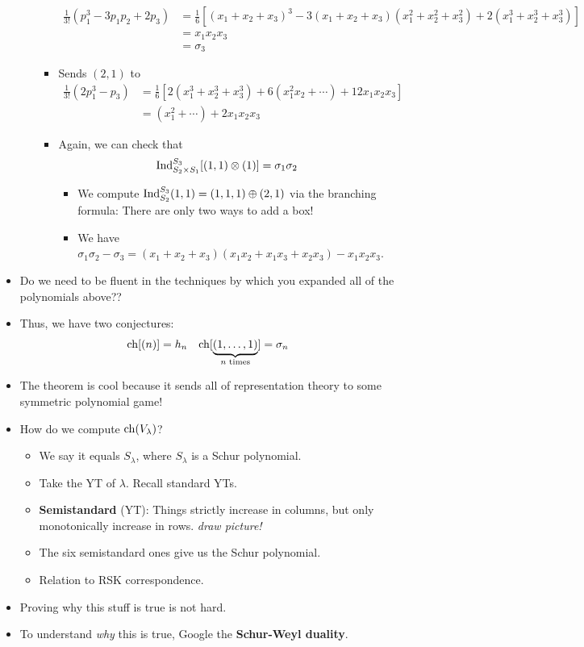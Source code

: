 \documentclass[../notes.tex]{subfiles}
\begin{document}
\begin{itemize}
\begin{enumerate}
\begin{itemize}
\begin{align*}
                \frac{1}{3!}(p_1^3-3p_1p_2+2p_3) &= \frac{1}{6}[(x_1+x_2+x_3)^3-3(x_1+x_2+x_3)(x_1^2+x_2^2+x_3^2)+2(x_1^3+x_2^3+x_3^3)]\\
                &= x_1x_2x_3\\
                &= \sigma_3
            \end{align*}
            \item Sends $(2,1)$ to
            \begin{align*}
                \frac{1}{3!}(2p_1^3-p_3) &= \frac{1}{6}[2(x_1^3+x_2^3+x_3^3)+6(x_1^2x_2+\cdots)+12x_1x_2x_3]\\
                &= (x_1^2+\cdots)+2x_1x_2x_3
            \end{align*}
            \item Again, we can check that
            \begin{align*}
                \operatorname{Ind}_{S_2\times S_1}^{S_3}[(1,1)\otimes(1)] &= \sigma_1\sigma_2
            \end{align*}
            \begin{itemize}
                \item We compute $\operatorname{Ind}_{S_2}^{S_3}(1,1)=(1,1,1)\oplus(2,1)$ via the branching formula: There are only two ways to add a box!
                \item We have $\sigma_1\sigma_2-\sigma_3=(x_1+x_2+x_3)(x_1x_2+x_1x_3+x_2x_3)-x_1x_2x_3$.
            \end{itemize}
        \end{itemize}
    \end{enumerate}
    \item Do we need to be fluent in the techniques by which you expanded all of the polynomials above??
    \item Thus, we have two conjectures:
    \begin{align*}
        \operatorname{ch}[(n)] &= h_n&
        \operatorname{ch}[\underbrace{(1,\dots,1)}_{n\text{ times}}] &= \sigma_n
    \end{align*}
    \item The theorem is cool because it sends all of representation theory to some symmetric polynomial game!
    \item How do we compute $\operatorname{ch}(V_\lambda)$?
    \begin{itemize}
        \item We say it equals $S_\lambda$, where $S_\lambda$ is a Schur polynomial.
        \item Take the YT of $\lambda$. Recall standard YTs.
        \item \textbf{Semistandard} (YT): Things strictly increase in columns, but only monotonically increase in rows. \emph{draw picture!}
        \item The six semistandard ones give us the Schur polynomial.
        \item Relation to RSK correspondence.
    \end{itemize}
    \item Proving why this stuff is true is not hard.
    \item To understand \emph{why} this is true, Google the \textbf{Schur-Weyl duality}.
\end{itemize}
\end{document}

